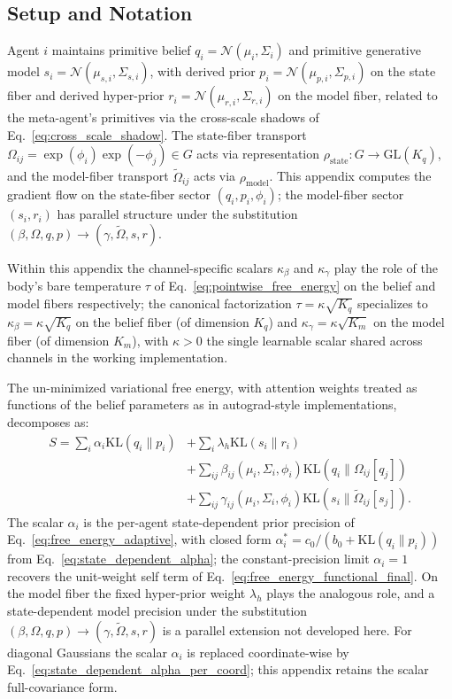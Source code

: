 \documentclass[11pt]{article}
\begin{document}
\subsection*{Setup and Notation}

Agent $i$ maintains primitive belief $q_i = \mathcal{N}(\mu_i, \Sigma_i)$ and primitive generative model $s_i = \mathcal{N}(\mu_{s,i}, \Sigma_{s,i})$, with derived prior $p_i = \mathcal{N}(\mu_{p,i}, \Sigma_{p,i})$ on the state fiber and derived hyper-prior $r_i = \mathcal{N}(\mu_{r,i}, \Sigma_{r,i})$ on the model fiber, related to the meta-agent's primitives via the cross-scale shadows of Eq.~\eqref{eq:cross_scale_shadow}. The state-fiber transport $\Omega_{ij} = \exp(\phi_i)\exp(-\phi_j) \in G$ acts via representation $\rho_{\mathrm{state}}: G \to \mathrm{GL}(K_q)$, and the model-fiber transport $\tilde\Omega_{ij}$ acts via $\rho_{\mathrm{model}}$. This appendix computes the gradient flow on the state-fiber sector $(q_i, p_i, \phi_i)$; the model-fiber sector $(s_i, r_i)$ has parallel structure under the substitution $(\beta, \Omega, q, p) \to (\gamma, \tilde\Omega, s, r)$.

Within this appendix the channel-specific scalars $\kappa_\beta$ and $\kappa_\gamma$ play the role of the body's bare temperature $\tau$ of Eq.~\eqref{eq:pointwise_free_energy} on the belief and model fibers respectively; the canonical factorization $\tau = \kappa\sqrt{K_q}$ specializes to $\kappa_\beta = \kappa\sqrt{K_q}$ on the belief fiber (of dimension $K_q$) and $\kappa_\gamma = \kappa\sqrt{K_m}$ on the model fiber (of dimension $K_m$), with $\kappa > 0$ the single learnable scalar shared across channels in the working implementation.

The un-minimized variational free energy, with attention weights treated as functions of the belief parameters as in autograd-style implementations, decomposes as:
\begin{equation}
\begin{aligned}
S = \sum_i \alpha_i \mathrm{KL}(q_i \| p_i) &+ \sum_i \lambda_h \mathrm{KL}(s_i \| r_i) \\
 &+ \sum_{ij} \beta_{ij}(\mu_i, \Sigma_i, \phi_i) \mathrm{KL}(q_i \| \Omega_{ij}[q_j]) \\
 &+ \sum_{ij} \gamma_{ij}(\mu_i, \Sigma_i, \phi_i) \mathrm{KL}(s_i \| \tilde{\Omega}_{ij}[s_j]).
\end{aligned}
\end{equation}
The scalar $\alpha_i$ is the per-agent state-dependent prior precision of Eq.~\eqref{eq:free_energy_adaptive}, with closed form $\alpha_i^* = c_0/(b_0 + \mathrm{KL}(q_i \| p_i))$ from Eq.~\eqref{eq:state_dependent_alpha}; the constant-precision limit $\alpha_i = 1$ recovers the unit-weight self term of Eq.~\eqref{eq:free_energy_functional_final}. On the model fiber the fixed hyper-prior weight $\lambda_h$ plays the analogous role, and a state-dependent model precision under the substitution $(\beta, \Omega, q, p) \to (\gamma, \tilde\Omega, s, r)$ is a parallel extension not developed here. For diagonal Gaussians the scalar $\alpha_i$ is replaced coordinate-wise by Eq.~\eqref{eq:state_dependent_alpha_per_coord}; this appendix retains the scalar full-covariance form.
\end{document}

